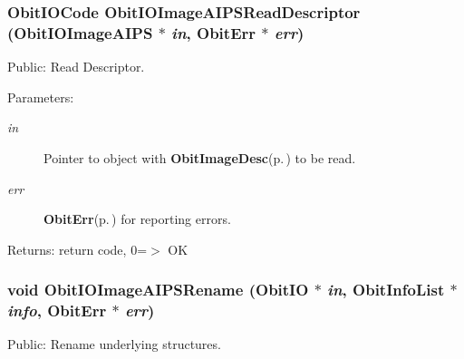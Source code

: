 \subsubsection{\setlength{\rightskip}{0pt plus 5cm}Obit\-IOCode Obit\-IOImage\-AIPSRead\-Descriptor ({\bf Obit\-IOImage\-AIPS} $\ast$ {\em in}, {\bf Obit\-Err} $\ast$ {\em err})}\label{ObitIOImageAIPS_8h_a16}


Public: Read Descriptor. 

\begin{Desc}
\item[Parameters:]
\begin{description}
\item[{\em in}]Pointer to object with {\bf Obit\-Image\-Desc}{\rm (p.\,\pageref{structObitImageDesc})} to be read. \item[{\em err}]{\bf Obit\-Err}{\rm (p.\,\pageref{structObitErr})} for reporting errors. \end{description}
\end{Desc}
\begin{Desc}
\item[Returns:]return code, 0=$>$ OK \end{Desc}
\subsubsection{\setlength{\rightskip}{0pt plus 5cm}void Obit\-IOImage\-AIPSRename ({\bf Obit\-IO} $\ast$ {\em in}, {\bf Obit\-Info\-List} $\ast$ {\em info}, {\bf Obit\-Err} $\ast$ {\em err})}\label{ObitIOImageAIPS_8h_a7}


Public: Rename underlying structures. 

